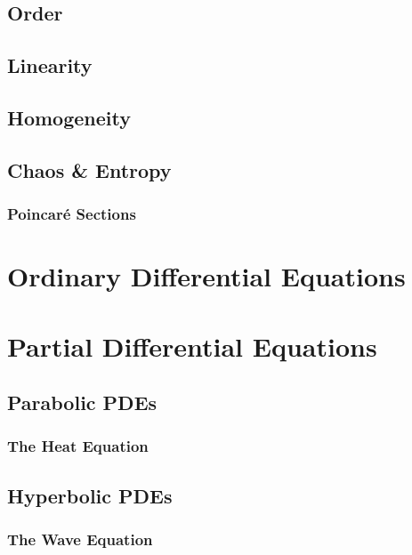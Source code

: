 \documentclass{report}
\begin{document}
        \subsection{Order}

        \subsection{Linearity}

        \subsection{Homogeneity}

        \subsection{Chaos \& Entropy}

            \subsubsection{Poincar{\'e} Sections}

    \section{Ordinary Differential Equations}

    \section{Partial Differential Equations}

        \subsection{Parabolic PDEs}

            \subsubsection{The Heat Equation}

        \subsection{Hyperbolic PDEs}

            \subsubsection{The Wave Equation}
\end{document}
